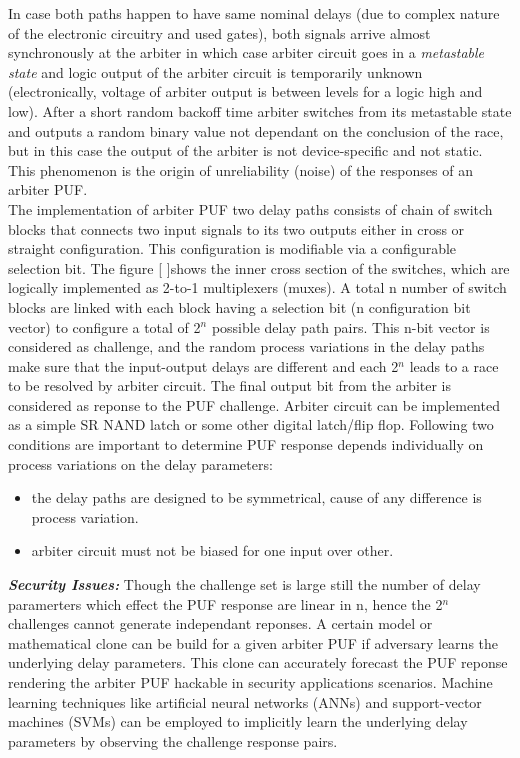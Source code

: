 In case both paths happen to have same nominal delays (due to complex nature of the electronic circuitry and used gates), both signals arrive almost synchronously at the arbiter in which case arbiter circuit goes in a \emph{metastable state} and logic output of the arbiter circuit is temporarily unknown (electronically, voltage of arbiter output is between levels for a logic high and low). After a short random backoff time arbiter switches from its metastable state and outputs a random binary value not dependant on the conclusion of the race, but in this case the output of the arbiter is not device-specific and not static. This phenomenon is the origin of unreliability (noise) of the responses of an arbiter PUF.\\

The implementation of arbiter PUF two delay paths consists of chain of switch blocks that connects two input signals to its two outputs either in cross or straight configuration. This configuration is modifiable via a configurable selection bit. The figure [ ]shows the inner cross section of the switches, which are logically implemented as 2-to-1 multiplexers (muxes). A total n number of switch blocks are linked with each block having a selection bit (n configuration bit vector) to
configure a total of 2$^n$ possible delay path pairs. This n-bit vector is considered as challenge, and the random process variations in the delay paths make sure that the input-output delays are different and each 2$^n$ leads to a race to be resolved by arbiter circuit. The final output bit from the arbiter is considered as reponse to the PUF challenge. Arbiter circuit can be implemented as a simple SR NAND latch or some other digital latch/flip flop. Following two conditions are
important to determine PUF response depends individually on process variations on the delay parameters:
\begin{itemize}
	\item the delay paths are designed to be symmetrical, cause of any difference is process variation.
	\item arbiter circuit must not be biased for one input over other.
\end{itemize}

\textbf{\emph{Security Issues:}}
Though the challenge set is large still the number of delay paramerters which effect the PUF response are linear in n, hence the 2$^n$ challenges cannot generate independant reponses. A certain model or mathematical clone can be build for a given arbiter PUF if adversary learns the underlying delay parameters. This clone can accurately forecast the PUF reponse rendering the arbiter PUF hackable in security applications scenarios. Machine learning techniques like artificial neural
networks (ANNs) and support-vector machines (SVMs) can be employed to implicitly learn the underlying delay parameters by observing the challenge response pairs.

